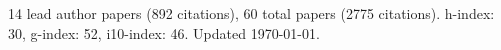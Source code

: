 14 lead author papers (892 citations),
60 total papers (2775 citations).\newline
h-index: 30, g-index: 52, i10-index: 46. Updated \today.
